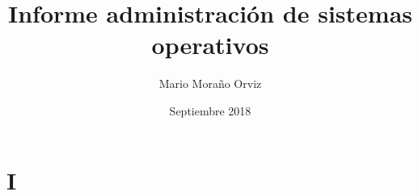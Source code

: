 \documentclass[12pt,twoside,a4paper, spanish]{article}
\begin{document}
	
	\title{Informe administración de sistemas operativos}
	\author{Mario Moraño Orviz}
	\date{Septiembre 2018}
	\maketitle
	
	\begin{abstract}

	\end{abstract}

    \section{I}
    

	
\end{document}
